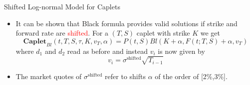 \documentclass{beamer}
\begin{document}
\begin{frame}{Shifted Log-normal Model for Caplets}
\begin{itemize}
	\item It can be shown that Black formula provides valid solutions if strike and forward rate are \textcolor{red}{shifted}. For a $(T,S)$ caplet with strike $K$ we get
	\begin{equation}
		\textbf{Caplet}_{Bl}(t,T,S,\tau,K,v_T,\alpha) = P(t,S) Bl(K+\alpha,F(t;T,S)+\alpha,v_T)
	\end{equation}
	where $d_1$ and $d_2$ read as before and instead $v_i$ is now given by
	\begin{equation*}
		v_i = \sigma^{\text{shifted}}\sqrt{T_{i-1}}
	\end{equation*}
	\item The market quotes of $\sigma^{\text{shifted}}$ refer to shifts $\alpha$ of the order of [2\%,3\%].
\end{itemize}
\end{frame}
\end{document}
